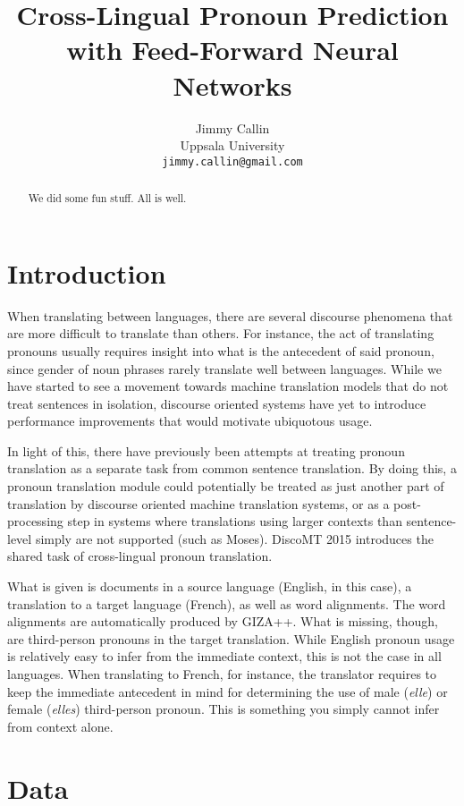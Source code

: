 \documentclass[11pt]{article}
\title{Cross-Lingual Pronoun Prediction with Feed-Forward Neural Networks}
\author{Jimmy Callin \\
  Uppsala University \\
  {\tt jimmy.callin@gmail.com}}
\date{}
\begin{document}
\maketitle
\begin{abstract}
    We did some fun stuff. All is well.
\end{abstract}


\section{Introduction}

When translating between languages, there are several discourse phenomena that are more difficult to translate than others.
For instance, the act of translating pronouns usually requires insight into what is the antecedent of said pronoun, since gender of noun phrases rarely translate well between languages.
While we have started to see a movement towards machine translation models that do not treat sentences in isolation, discourse oriented systems have yet to introduce performance improvements that would motivate ubiquotous usage.

In light of this, there have previously been attempts at treating pronoun translation as a separate task from common sentence translation.
By doing this, a pronoun translation module could potentially be treated as just another part of translation by discourse oriented machine translation systems, or as a post-processing step in systems where translations using larger contexts than sentence-level simply are not supported (such as Moses).
DiscoMT 2015 introduces the shared task of cross-lingual pronoun translation.

What is given is documents in a source language (English, in this case), a translation to a target language (French), as well as word alignments.
The word alignments are automatically produced by GIZA++.
What is missing, though, are third-person pronouns in the target translation.
While English pronoun usage is relatively easy to infer from the immediate context, this is not the case in all languages.
When translating to French, for instance, the translator requires to keep the immediate antecedent in mind for determining the use of male (\emph{elle}) or female (\emph{elles}) third-person pronoun.
This is something you simply cannot infer from context alone.


\section{Data}
\end{document}
